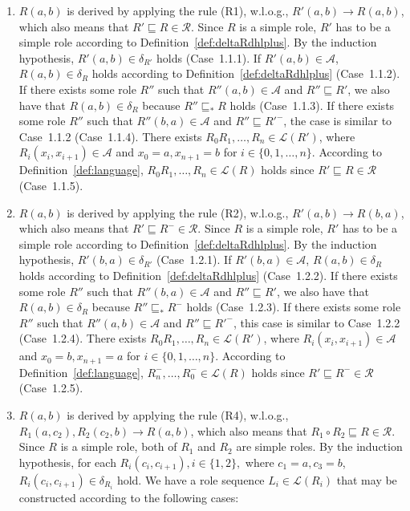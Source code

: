 \begin{enumerate}[leftmargin=12ex,label=Case~1.\arabic*, ref=Case~1.\arabic*]
\item $R(a,b)$ is derived by applying the rule (R1), w.l.o.g., $R'(a,b)\rightarrow R(a,b)$,
    which also means that $R'\sqsubseteq R\in\mathcal{R}$. Since $R$ is a simple role, $R'$ has to
    be a simple role according to Definition~\ref{def:deltaRdhlplus}. By the induction hypothesis,
    $R'(a,b)\in\delta_{R'}$ holds (Case~1.1.1). If $R'(a,b)\in\mathcal{A}$, $R(a,b)\in\delta_{R}$
    holds according to Definition~\ref{def:deltaRdhlplus} (Case~1.1.2). If there exists some
    role $R''$ such that $R''(a,b)\in\mathcal{A}$ and $R''\sqsubseteq R'$, we also have that
    $R(a,b)\in\delta_{R}$ because $R''\sqsubseteq_* R$ holds (Case~1.1.3). If there exists some
    role $R''$ such that $R''(b,a)\in\mathcal{A}$ and $R''\sqsubseteq R'^-$, the case is
    similar to Case~1.1.2 (Case~1.1.4). There exists $R_0R_1,\ldots ,R_n\in\mathcal{L}(R')$,
    where $R_i(x_i,x_{i+1})\in\mathcal{A}$ and $x_0=a, x_{n+1}=b$ for $i\in\{0,1,\ldots ,n\}$.
    According to Definition~\ref{def:language}, $R_0R_1,\ldots ,R_n\in\mathcal{L}(R)$ holds since
    $R'\sqsubseteq R\in\mathcal{R}$ (Case~1.1.5).\label{dhlplus:NTIcaseR1}

\item $R(a,b)$ is derived by applying the rule (R2), w.l.o.g., $R'(a,b)\rightarrow R(b,a)$,
    which also means that $R'\sqsubseteq R^-\in\mathcal{R}$. Since $R$ is a simple role, $R'$ has to
    be a simple role according to Definition~\ref{def:deltaRdhlplus}. By the induction hypothesis,
    $R'(b,a)\in\delta_{R'}$ (Case~1.2.1). If $R'(b,a)\in\mathcal{A}$, $R(a,b)\in\delta_{R}$
    holds according to Definition~\ref{def:deltaRdhlplus} (Case~1.2.2). If there exists some
    role $R''$ such that $R''(b,a)\in\mathcal{A}$ and $R''\sqsubseteq R'$, we also have that
    $R(a,b)\in\delta_{R}$ because $R''\sqsubseteq_* R^-$ holds (Case~1.2.3). If there exists some
    role $R''$ such that $R''(a,b)\in\mathcal{A}$ and $R''\sqsubseteq R'^-$, this case is
    similar to Case~1.2.2 (Case~1.2.4). There exists $R_0R_1,\ldots ,R_n\in\mathcal{L}(R')$,
    where $R_i(x_i,x_{i+1})\in\mathcal{A}$ and $x_0=b, x_{n+1}=a$ for $i\in\{0,1,\ldots ,n\}$.
    According to Definition~\ref{def:language}, $R_n^-,\ldots ,R_0^-\in\mathcal{L}(R)$ holds since
    $R'\sqsubseteq R^-\in\mathcal{R}$ (Case~1.2.5).\label{dhlplus:NTIcaseR2}

\item $R(a,b)$ is derived by applying the rule (R4), w.l.o.g.,
    $R_1(a,c_2),R_2(c_2,b)\rightarrow R(a,b)$,
    which also means that $R_1\circ R_2\sqsubseteq R\in\mathcal{R}$.
    Since $R$ is a simple role, both of $R_1$ and $R_2$ are simple roles. By the induction hypothesis,
    for each $R_i(c_i,c_{i+1}), i\in\{1,2\},$ where $c_1=a, c_3=b$, $R_i(c_i,c_{i+1})\in\delta_{R_i}$
    hold. We have a role sequence $L_i\in\mathcal{L}(R_i)$ that may be
    constructed according to the following cases:


\end{enumerate}
